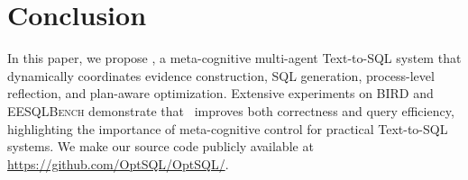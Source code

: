 \section{Conclusion}
\label{sec:conclusion}

In this paper, we propose \toolname, a meta-cognitive multi-agent Text-to-SQL system that dynamically coordinates evidence construction, SQL generation, process-level reflection, and plan-aware optimization.
Extensive experiments on \textsc{BIRD} and \textsc{EESQLBench} demonstrate that \toolname\ improves both correctness and query efficiency, highlighting the importance of meta-cognitive control for practical Text-to-SQL systems.
We make our source code publicly available at \url{https://github.com/OptSQL/OptSQL/}.

\section*{}
